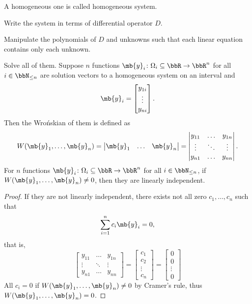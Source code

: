 \documentclass[a4paper,12pt]{report}
\begin{document}
A homogeneous one is called homogeneous system.
\ben
\item Write the system in terms of differential operator $D$.
\item Manipulate the polynomials of $D$ and unknowns such that each linear equation contains only each unknown.
\item Solve all of them.
\een
{}
Suppose $n$ functions $\mb{y}_i\colon\Omega_i\subseteq\bbR\to\bbR^n$ for all $i\in\bbN_{\le n}$ are solution vectors to a homogeneous system on an interval and
\[\mb{y}_i=\begin{bmatrix}y_{1i}\\\vdots\\y_{ni}\end{bmatrix}.\]
Then the Wrońskian of them is defined as
\[W(\mb{y}_1,\ldots,\mb{y}_n)=\begin{vmatrix}\mb{y}_1&\ldots&\mb{y}_n\end{vmatrix}=\begin{vmatrix}y_{11}&\ldots&y_{1n}\\\vdots&\ddots&\vdots\\y_{n1}&\ldots&y_{nn}\end{vmatrix}.\]
For $n$ functions $\mb{y}_i\colon\Omega_i\subseteq\bbR\to\bbR^n$ for all $i\in\bbN_{\le n}$, if $W(\mb{y}_1,\ldots,\mb{y}_n)\ne0$, then they are linearly independent.
\begin{proof}
If they are not linearly independent, there exists not all zero $c_1,\ldots,c_n$ such that
\[\sum_{i=1}^nc_i\mb{y}_i=0,\]
that is,
\[\begin{bmatrix}y_{11}&\ldots&y_{1n}\\\vdots&\ddots&\vdots\\y_{n1}&\ldots&y_{nn}\end{bmatrix}=\begin{bmatrix}c_1\\c_2\\\vdots\\c_n\end{bmatrix}=\begin{bmatrix}0\\0\\\vdots\\0\end{bmatrix}\]
All $c_i=0$ if $W(\mb{y}_1,\ldots,\mb{y}_n)\ne 0$ by Cramer's rule, thus $W(\mb{y}_1,\ldots,\mb{y}_n)=0$.
\end{proof}
\end{document}
